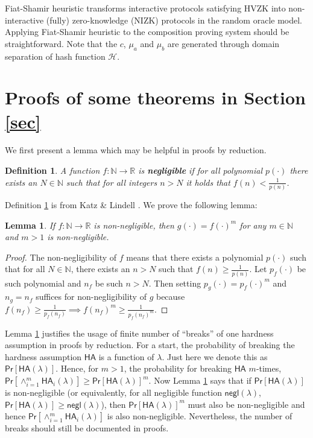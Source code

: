 \documentclass{article}
\newtheorem{definition}{Definition}[section]
\newtheorem{lemma}[theorem]{Lemma}
\begin{document}
Fiat-Shamir heuristic transforms interactive protocols satisfying HVZK into non-interactive (fully) zero-knowledge (NIZK) protocols in the random oracle model. Applying Fiat-Shamir heuristic to the composition proving system should be straightforward. Note that the $c$, $\mu_a$ and $\mu_b$ are generated through domain separation of hash function $\mathcal{H}$.

\section{Proofs of some theorems in Section \ref{sec}}\label{proofs}
We first present a lemma which may be helpful in proofs by reduction.

\begin{definition}\label{negl}
A function $f:\mathbb{N}\rightarrow\mathbb{R}$ is \textbf{\em negligible} if for all polynomial $p(\cdot)$ there exists an $N\in\mathbb{N}$ such that for all integers $n>N$ it holds that $f(n)<\frac{1}{p(n)}$.
\end{definition}
\noindent Definition \ref{negl} is from Katz \& Lindell \cite{katz-lindell}. We prove the following lemma:

\begin{lemma}\label{negl-exp}
If $f:\mathbb{N}\rightarrow\mathbb{R}$ is non-negligible, then $g(\cdot)=f(\cdot)^m$ for any $m\in\mathbb{N}$ and $m>1$ is non-negligible.
\end{lemma}
\begin{proof}
The non-negligibility of $f$ means that there exists a polynomial $p(\cdot)$ such that for all $N\in\mathbb{N}$, there exists an $n>N$ such that $f(n)\ge\frac{1}{p(n)}$. Let $p_f(\cdot)$ be such polynomial and $n_f$ be such $n>N$. Then setting $p_g(\cdot)=p_f(\cdot)^m$ and $n_g=n_f$ suffices for non-negligibility of $g$ because $f(n_f)\ge\frac{1}{p_f(n_f)}\implies f(n_f)^m\ge\frac{1}{p_f(n_f)^m}$.
\end{proof}
\noindent Lemma \ref{negl-exp} justifies the usage of finite number of ``breaks'' of one hardness assumption in proofs by reduction. For a start, the probability of breaking the hardness assumption $\textsf{HA}$ is a function of $\lambda$. Just here we denote this as $\textsf{Pr}[\textsf{HA}(\lambda)]$. Hence, for $m>1$, the probability for breaking $\textsf{HA}$ $m$-times, $\textsf{Pr}[\wedge_{i=1}^{m}{\textsf{HA}_i(\lambda)}]\ge\textsf{Pr}[\textsf{HA}(\lambda)]^m$. Now Lemma \ref{negl-exp} says that if $\textsf{Pr}[\textsf{HA}(\lambda)]$ is non-negligible (or equivalently, for all negligible function $\textsf{negl}(\lambda)$, $\textsf{Pr}[\textsf{HA}(\lambda)]\ge\textsf{negl}(\lambda)$), then $\textsf{Pr}[\textsf{HA}(\lambda)]^m$ must also be non-negligible and hence $\textsf{Pr}[\wedge_{i=1}^{m}{\textsf{HA}_i(\lambda)}]$ is also non-negligible. Nevertheless, the number of breaks should still be documented in proofs.
\end{document}
